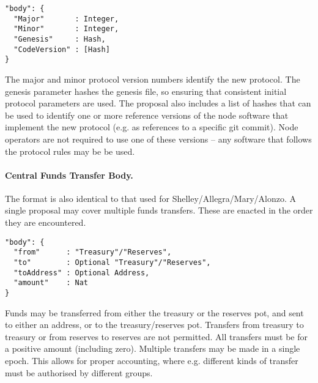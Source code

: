 \begin{verbatim}
"body": {
  "Major"       : Integer,
  "Minor"       : Integer,
  "Genesis"     : Hash,
  "CodeVersion" : [Hash]
}
\end{verbatim}

The major and minor protocol version numbers identify the new protocol.  The genesis parameter hashes the genesis file, so ensuring that consistent initial protocol parameters are used.
The proposal also includes a list of hashes that can be used to identify one or more reference versions of the node software that implement the new protocol (e.g. as references to a specific git commit).
Node operators are not required to use one of these versions -- any software that follows the protocol rules may be be used.


\paragraph{Central Funds Transfer Body.}  The format is also identical to that used for Shelley/Allegra/Mary/Alonzo.
A single proposal may cover multiple funds transfers.  These are enacted in the order they are encountered.

\begin{verbatim}
"body": {
  "from"      : "Treasury"/"Reserves",
  "to"        : Optional "Treasury"/"Reserves",
  "toAddress" : Optional Address,
  "amount"    : Nat
}
\end{verbatim}

Funds may be transferred from either the treasury or the reserves pot, and sent to either an address, or to the treasury/reserves pot.
Transfers from treasury to treasury or from reserves to reserves are not permitted.  All transfers must be for a positive amount (including zero).
Multiple transfers may be made in a single epoch.  This allows for proper accounting, where e.g. different kinds of transfer must
be authorised by different groups.

